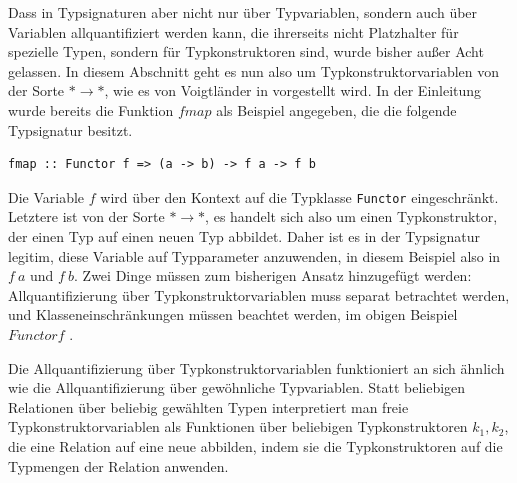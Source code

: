 Dass in Typsignaturen aber nicht nur über Typvariablen, sondern auch über Variablen allquantifiziert werden kann, die
ihrerseits nicht Platzhalter für spezielle Typen, sondern für Typkonstruktoren sind, wurde bisher außer Acht gelassen. In diesem
Abschnitt geht es nun also um Typkonstruktorvariablen von der Sorte $* \rightarrow *$, wie es von Voigtländer in \cite{voigtlander}
vorgestellt wird. In der Einleitung wurde bereits die Funktion $fmap$ als Beispiel angegeben, die die folgende Typsignatur besitzt.



\begin{verbatim}
fmap :: Functor f => (a -> b) -> f a -> f b
\end{verbatim}

Die Variable $f$ wird über den Kontext auf die Typklasse \texttt{Functor} eingeschränkt. Letztere ist von der Sorte $* \rightarrow *$,
es handelt sich also um einen Typkonstruktor, der einen Typ auf einen neuen Typ abbildet.
Daher ist es in der Typsignatur legitim, diese Variable auf Typparameter anzuwenden, in diesem Beispiel also in $f\ a$ und $f\ b$.
Zwei Dinge müssen zum bisherigen Ansatz hinzugefügt werden: Allquantifizierung über Typkonstruktorvariablen muss separat betrachtet werden,
und Klasseneinschränkungen müssen beachtet werden, im obigen Beispiel $Functor f$ \cite{voigtlander}.

Die Allquantifizierung über Typkonstruktorvariablen funktioniert an sich ähnlich wie die Allquantifizierung über gewöhnliche
Typvariablen. Statt beliebigen Relationen über beliebig gewählten Typen interpretiert man freie Typkonstruktorvariablen als
Funktionen über beliebigen Typkonstruktoren $k_1, k_2$, die eine Relation auf eine neue abbilden, indem sie die Typkonstruktoren
auf die Typmengen der Relation anwenden.

